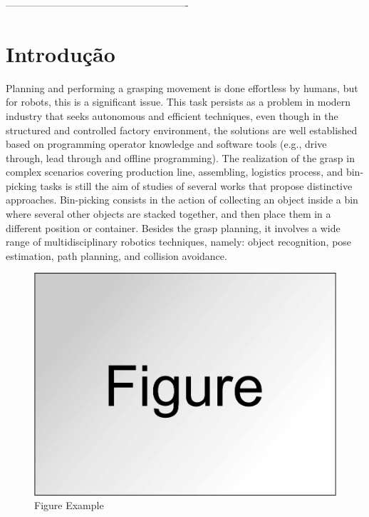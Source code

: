 
-------------------------------------------------------
\chapter{Introdução}
\label{Ch:Introducao}

Planning and performing a grasping movement is done effortless by humans, but for robots, this is a significant issue. This task persists as a problem in modern industry that seeks autonomous and efficient techniques, even though in the structured and controlled factory environment, the solutions are well established based on programming operator knowledge and software tools (e.g., drive through, lead through and offline programming). The realization of the grasp in complex scenarios covering production line, assembling, logistics process, and bin-picking tasks is still the aim of studies of several works that propose distinctive approaches. Bin-picking consists in the action of collecting an object inside a bin where several other objects are stacked together, and then place them in a different position or container. Besides the grasp planning, it involves a wide range of multidisciplinary robotics techniques, namely: object recognition, pose estimation, path planning, and collision avoidance.
 

\begin{figure}
\centering
\includegraphics[width=0.7\linewidth]{Cap1/Figure.jpg} 
\caption{Figure Example}
\label{Fig:FigExample}
\end{figure}

